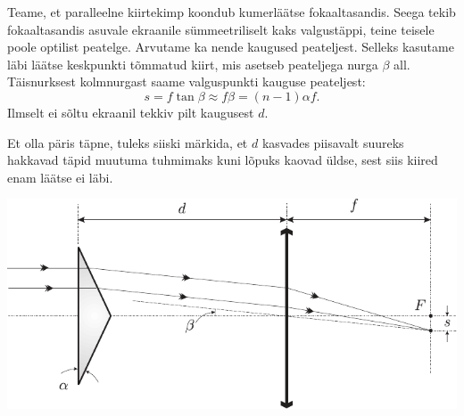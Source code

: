 {Teame, et paralleelne kiirtekimp koondub kumerläätse fokaaltasandis. Seega tekib fokaaltasandis asuvale ekraanile sümmeetriliselt kaks valgustäppi, teine teisele poole optilist peatelge. Arvutame ka nende kaugused peateljest. Selleks kasutame läbi läätse keskpunkti tõmmatud kiirt, mis asetseb peateljega nurga $\beta$ all. Täisnurksest kolmnurgast saame valguspunkti kauguse peateljest:
\[
s = f \tan \beta \approx f \beta = (n - 1)\alpha f.
\]
Ilmselt ei sõltu ekraanil tekkiv pilt kaugusest $d$.

Et olla päris täpne, tuleks siiski märkida, et $d$ kasvades piisavalt suureks hakkavad täpid muutuma tuhmimaks kuni lõpuks kaovad üldse, sest siis kiired enam läätse ei läbi.

\begin{center}
	\includegraphics[width=\linewidth]{2006-v2g-06-lah}
\end{center}
\fi
}